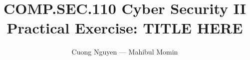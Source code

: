 \documentclass{article}
\title{COMP.SEC.110 Cyber Security II
    \large Practical Exercise: TITLE HERE\!
}
\author{Cuong Nguyen --- Mahibul Momin}
\begin{document}
    
\maketitle
\tableofcontents
\newpage

\listoffigures
\newpage


\printbibliography{}
\end{document}
